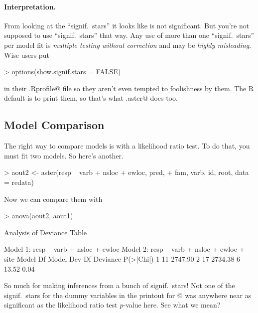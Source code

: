 \documentclass[11pt]{article}
\begin{document}
\paragraph{Interpretation.} From looking at the ``signif.\ stars''
it looks like \verb@site@ is not significant.  But you're not supposed
to use ``signif.\ stars'' that way.  Any use of more than one
``signif.\ stars'' per model fit is \emph{multiple testing without correction}
and may be \emph{highly misleading}.  Wise users put
\begin{Schunk}
\begin{Sinput}
> options(show.signif.stars = FALSE)
\end{Sinput}
\end{Schunk}
in their \verb@.Rprofile@ file so they aren't even tempted to foolishness
by them.  The R default is to print them, so that's what \verb@summary.aster@
does too.

\subsection{Model Comparison}

The right way to compare models is with a likelihood ratio test.
To do that, you must fit two models.  So here's another.
\begin{Schunk}
\begin{Sinput}
> aout2 <- aster(resp ~ varb + nsloc + ewloc, pred, 
+     fam, varb, id, root, data = redata)
\end{Sinput}
\end{Schunk}
Now we can compare them with
\begin{Schunk}
\begin{Sinput}
> anova(aout2, aout1)
\end{Sinput}
\begin{Soutput}
Analysis of Deviance Table

Model 1: resp ~ varb + nsloc + ewloc
Model 2: resp ~ varb + nsloc + ewloc + site
  Model Df Model Dev Df Deviance P(>|Chi|)
1       11   2747.90                      
2       17   2734.38  6    13.52      0.04
\end{Soutput}
\end{Schunk}

So much for making inferences from a bunch of signif.\ stars!
Not one of the signif.\ stars for the \verb@site@ dummy variables
in the printout for @ was anywhere near as significant
as the likelihood ratio test $p$-value here.  See what we mean?
\end{document}

